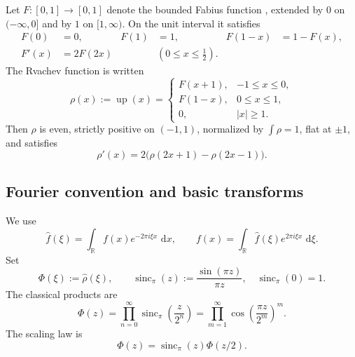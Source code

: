 \documentclass[11pt]{article}
\theoremstyle{definition}
\theoremstyle{remark}
\newcommand{\R}{\mathbb R}
\newcommand{\dd}{\,\mathrm d}
\newcommand{\Up}{\operatorname{up}}
\newcommand{\sincpi}{\operatorname{sinc}_{\pi}}
\begin{document}
Let \(F:[0,1]\to[0,1]\) denote the bounded Fabius function \cite{p3:Fabius1966,p3:AriasTranslation}, extended by \(0\) on
\(( -\infty,0]\) and by \(1\) on \([1,\infty)\).  On the unit interval it satisfies
\begin{align}
 F(0)&=0, & F(1)&=1, & F(1-x)&=1-F(x), \label{p3:eq:F-symmetry}\\
 F'(x)&=2F(2x) &&(0\le x\le\tfrac12). \label{p3:eq:F-diff}
\end{align}
The Rvachev function is written
\begin{equation}
 \rho(x):=\Up(x)=
 \begin{cases}
 F(x+1),&-1\le x\le0,\\
 F(1-x),&0\le x\le1,\\
 0,&|x|\ge1.
 \end{cases}                                                \label{p3:eq:rho-fold}
\end{equation}
Then \(\rho\) is even, strictly positive on \((-1,1)\), normalized by
\(\int\rho=1\), flat at \(\pm1\), and satisfies
\begin{equation}
 \rho'(x)=2\bigl(\rho(2x+1)-\rho(2x-1)\bigr).                \label{p3:eq:rho-dde}
\end{equation}

\subsection{Fourier convention and basic transforms}

We use
\begin{equation}
 \widehat f(\xi)=\int_{\R}f(x)e^{-2\pi i\xi x}\,\dd x,
 \qquad
 f(x)=\int_{\R}\widehat f(\xi)e^{2\pi i\xi x}\,\dd\xi.       \label{p3:eq:fourier-convention}
\end{equation}
Set
\begin{equation}
 \Phi(\xi):=\widehat\rho(\xi),
 \qquad
 \sincpi(z):=\frac{\sin(\pi z)}{\pi z},\quad \sincpi(0)=1. \label{p3:eq:Phi-def}
\end{equation}
The classical products are
\begin{equation}
 \Phi(z)=\prod_{n=0}^{\infty}\sincpi\!\left(\frac{z}{2^n}\right)
 =\prod_{m=1}^{\infty}\cos\!\left(\frac{\pi z}{2^m}\right)^m. \label{p3:eq:Phi-products}
\end{equation}
The scaling law is
\begin{equation}
 \Phi(z)=\sincpi(z)\Phi(z/2).                                \label{p3:eq:Phi-scaling}
\end{equation}
\end{document}
